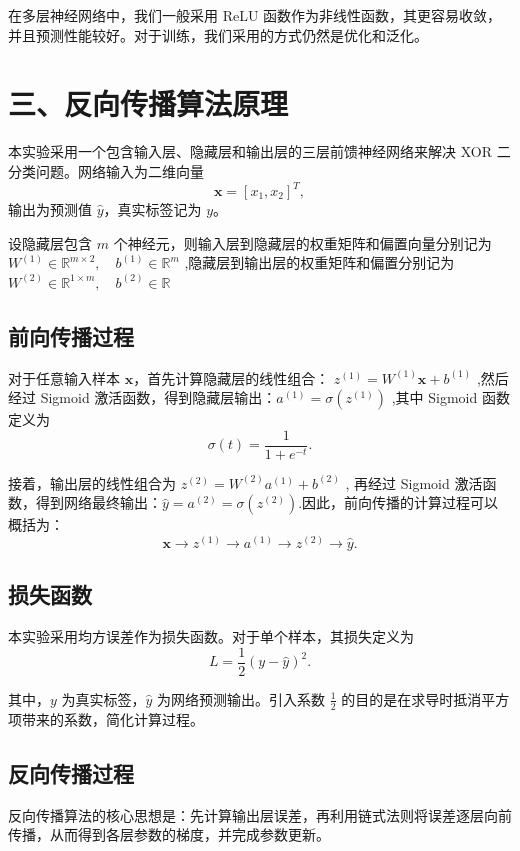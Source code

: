 \documentclass[12pt,a4paper]{ctexart}
\begin{document}
	在多层神经网络中，我们一般采用 ReLU 函数作为非线性函数，其更容易收敛，并且预测性能较好。对于训练，我们采用的方式仍然是优化和泛化。
	
	\section*{三、反向传播算法原理}
	
	本实验采用一个包含输入层、隐藏层和输出层的三层前馈神经网络来解决 XOR 二分类问题。网络输入为二维向量
	\[
	\mathbf{x} = [x_1,x_2]^T,
	\]
	输出为预测值 $\hat{y}$，真实标签记为 $y$。
	
	设隐藏层包含 $m$ 个神经元，则输入层到隐藏层的权重矩阵和偏置向量分别记为 $W^{(1)} \in \mathbb{R}^{m \times 2}, \quad b^{(1)} \in \mathbb{R}^{m}$ ,隐藏层到输出层的权重矩阵和偏置分别记为 $W^{(2)} \in \mathbb{R}^{1 \times m}, \quad b^{(2)} \in \mathbb{R}$
	
	\subsection{前向传播过程}
	
	对于任意输入样本 $\mathbf{x}$，首先计算隐藏层的线性组合： $z^{(1)} = W^{(1)}\mathbf{x} + b^{(1)}$ ,然后经过 Sigmoid 激活函数，得到隐藏层输出：$a^{(1)} = \sigma(z^{(1)})$ ,其中 Sigmoid 函数定义为
	\[
	\sigma(t) = \frac{1}{1+e^{-t}}.
	\]
	
	接着，输出层的线性组合为 $z^{(2)} = W^{(2)}a^{(1)} + b^{(2)}$ ,	再经过 Sigmoid 激活函数，得到网络最终输出：$	\hat{y} = a^{(2)} = \sigma(z^{(2)}).$因此，前向传播的计算过程可以概括为：
	\[
	\mathbf{x}
	\rightarrow z^{(1)}
	\rightarrow a^{(1)}
	\rightarrow z^{(2)}
	\rightarrow \hat{y}.
	\]
	
	\subsection{损失函数}
	
	本实验采用均方误差作为损失函数。对于单个样本，其损失定义为
	\[
	L = \frac{1}{2}(y-\hat{y})^2.
	\]
	
	其中，$y$ 为真实标签，$\hat{y}$ 为网络预测输出。引入系数 $\frac{1}{2}$ 的目的是在求导时抵消平方项带来的系数，简化计算过程。
	
	\subsection{反向传播过程}
	
	反向传播算法的核心思想是：先计算输出层误差，再利用链式法则将误差逐层向前传播，从而得到各层参数的梯度，并完成参数更新。
	
\end{document}
